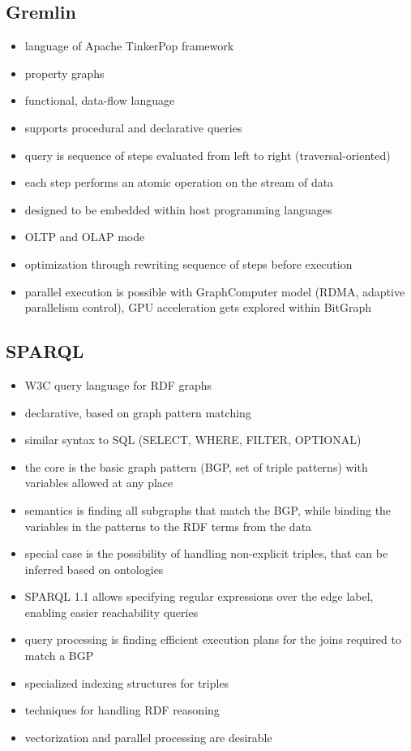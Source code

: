 \documentclass[sigconf,authordraft]{acmart}
\begin{document}
\subsection{Gremlin}
\begin{itemize}
	\item language of Apache TinkerPop framework
	\item property graphs
	\item functional, data-flow language
	\item supports procedural and declarative queries
	\item query is sequence of steps evaluated from left to right (traversal-oriented)
	\item each step performs an atomic operation on the stream of data
	\item designed to be embedded within host programming languages

	\item OLTP and OLAP mode
	\item optimization through rewriting sequence of steps before execution
	\item parallel execution is possible with GraphComputer model (RDMA, adaptive parallelism control), GPU acceleration gets explored within BitGraph
\end{itemize}

\subsection{SPARQL}
\begin{itemize}
	\item W3C query language for RDF graphs
	\item declarative, based on graph pattern matching
	\item similar syntax to SQL (SELECT, WHERE, FILTER, OPTIONAL)
	\item the core is the basic graph pattern (BGP, set of triple patterns) with variables allowed at any place
	\item semantics is finding all subgraphs that match the BGP, while binding the variables in the patterns to the RDF terms from the data
	\item special case is the possibility of handling non-explicit triples, that can be inferred based on ontologies
	\item SPARQL 1.1 allows specifying regular expressions over the edge label, enabling easier reachability queries

	\item query processing is finding efficient execution plans for the joins required to match a BGP
	\item specialized indexing structures for triples
	\item techniques for handling RDF reasoning
	\item vectorization and parallel processing are desirable
\end{itemize}
\end{document}
